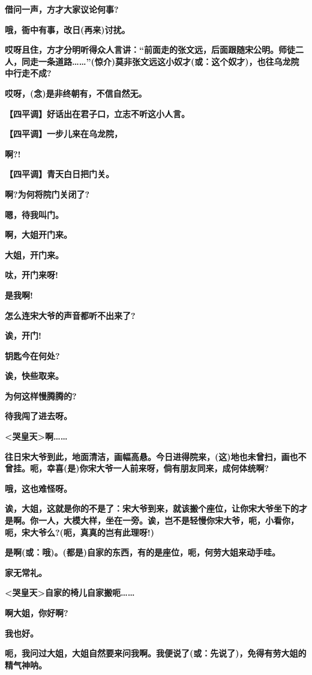 \textbf{借问一声，方才大家议论何事?}

\textbf{哦，衙中有事，改日(再来)讨扰。}

\textbf{哎呀且住，方才分明听得众人言讲：``前面走的张文远，后面跟随宋公明。师徒二人，同走一条道路\ldots{}\ldots{}''(惊介)莫非张文远这小奴才(或：这个奴才)，也往乌龙院中行走不成?}

\textbf{哎呀，(念)是非终朝有，不信自然无。}

\textbf{【四平调】好话出在君子口，立志不听这小人言。}

\textbf{【四平调】一步儿来在乌龙院，}

\textbf{啊?!}

\textbf{【四平调】青天白日把门关。}

\textbf{啊?为何将院门关闭了?}

\textbf{嗯，待我叫门。}

\textbf{啊，大姐开门来。}

\textbf{大姐，开门来。}

\textbf{呔，开门来呀!}

\textbf{是我啊!}

\textbf{怎么连宋大爷的声音都听不出来了?}

\textbf{诶，开门!}

\textbf{钥匙今在何处?}

\textbf{诶，快些取来。}

\textbf{为何这样慢腾腾的?}

\textbf{待我闯了进去呀。}

\textbf{\textless{}哭皇天\textgreater{}啊\ldots{}\ldots{}}

\textbf{往日宋大爷到此，地面清洁，画幅高悬。今日进得院来，(这)地也未曾扫，画也不曾挂。呃，幸喜(是)你宋大爷一人前来呀，倘有朋友同来，成何体统啊?}

\textbf{哦，这也难怪呀。}

\textbf{诶，大姐，这就是你的不是了：宋大爷到来，就该搬个座位，让你宋大爷坐下的才是啊。你一人，大模大样，坐在一旁。诶，岂不是轻慢你宋大爷，呃，小看你，呃，宋大爷么?(呃，真真的岂有此理呀!)}

\textbf{是啊(或：哦)。(都是)自家的东西，有的是座位，呃，何劳大姐来动手哇。}

\textbf{家无常礼。}

\textbf{\textless{}哭皇天\textgreater{}自家的椅儿自家搬呃\ldots{}\ldots{}}

\textbf{啊大姐，你好啊?}

\textbf{我也好。}

\textbf{呃，我问过大姐，大姐自然要来问我啊。我便说了(或：先说了)，免得有劳大姐的精气神呐。}

